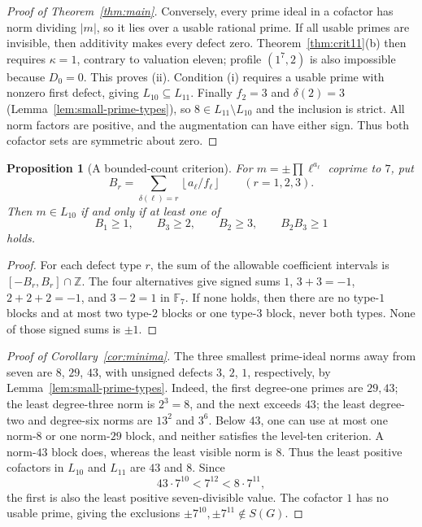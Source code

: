 \documentclass[11pt]{amsart}
\theoremstyle{plain}
\newtheorem{proposition}[theorem]{Proposition}
\theoremstyle{definition}
\numberwithin{equation}{section}
\newcommand{\Z}{\mathbb Z}
\newcommand{\F}{\mathbb F}
\newcommand{\GG}{G}
\begin{document}
\begin{proof}[Proof of Theorem~\ref{thm:main}]
Conversely, every prime ideal in a cofactor has norm dividing
$|m|$, so it lies over a usable rational prime. If all usable
primes are invisible, then additivity makes every defect zero.
Theorem~\ref{thm:crit11}(b) then requires $\kappa=1$, contrary
to valuation eleven; profile $(1^7,2)$ is also impossible
because $D_0=0$. This proves (ii). Condition (i) requires a
usable prime with nonzero first defect, giving
$L_{10}\subseteq L_{11}$. Finally $f_2=3$ and $\delta(2)=3$
(Lemma~\ref{lem:small-prime-types}), so
$8\in L_{11}\setminus L_{10}$ and the inclusion is strict.
All norm factors are positive, and the augmentation can have
either sign. Thus both cofactor sets are symmetric about zero.
\end{proof}

\begin{proposition}[A bounded-count criterion]\label{prop:blocks}
For $m=\pm\prod\ell^{a_\ell}$ coprime to $7$, put
\[
 B_r=\sum_{\delta(\ell)=r}\left\lfloor a_\ell/f_\ell\right\rfloor
 \qquad(r=1,2,3).
\]
Then $m\in L_{10}$ if and only if at least one of
\[
 B_1\ge1,\qquad B_3\ge2,\qquad B_2\ge3,\qquad B_2B_3\ge1
\]
holds.
\end{proposition}
\begin{proof}
For each defect type $r$, the sum of the allowable coefficient
intervals is
$[-B_r,B_r]\cap\Z$. The four alternatives give signed sums
$1$, $3+3=-1$, $2+2+2=-1$, and $3-2=1$ in $\F_7$.
If none holds, then there are no type-$1$ blocks and at most two
type-$2$ blocks or one type-$3$ block, never both types.
None of those signed sums is $\pm1$.
\end{proof}

\begin{proof}[Proof of Corollary~\ref{cor:minima}]
The three smallest prime-ideal norms away from seven are
$8$, $29$, $43$, with unsigned defects $3$, $2$, $1$,
respectively, by Lemma~\ref{lem:small-prime-types}.
Indeed, the first degree-one primes are $29,43$; the least
degree-three norm is $2^3=8$, and the next exceeds $43$;
the least degree-two and degree-six norms are $13^2$ and $3^6$.
Below $43$, one can use at most one norm-$8$ or one norm-$29$
block, and neither satisfies the level-ten criterion. A
norm-$43$ block does, whereas the least visible norm is $8$.
Thus the least positive cofactors in $L_{10}$ and $L_{11}$ are
$43$ and $8$. Since
\[
 43\cdot7^{10}<7^{12}<8\cdot7^{11},
\]
the first is also the least positive seven-divisible value.
The cofactor $1$ has no usable prime, giving the exclusions
$\pm7^{10},\pm7^{11}\notin S(\GG)$.
\end{proof}
\end{document}
